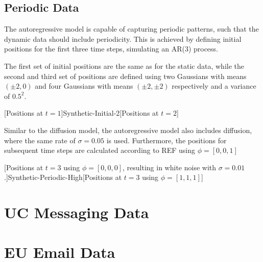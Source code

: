     \subsection{Periodic Data}
    
        The autoregressive model is capable of capturing periodic patterns, such that the dynamic data should include periodicity. This is achieved by defining initial positions for the first three time steps, simulating an AR(3) process. 
        
        The first set of initial positions are the same as for the static data, while the second and third set of positions are defined using two Gaussians with means $(\pm2,0)$ and four Gaussians with means $(\pm2,\pm2)$ respectively and a variance of $0.5^2$.
       
        [Positions at $t=1$]{Synthetic-Initial-2}[Positions at $t=2$]
        
        Similar to the diffusion model, the autoregressive model also includes diffusion, where the same rate of $\sigma=0.05$ is used. Furthermore, the positions for subsequent time steps are calculated according to REF using $\phi=[0, 0, 1]$
        
        
        
        
        
        [Positions at $t=3$ using $\phi=[0,0,0]$, resulting in white noise with $\sigma=0.01$.]{Synthetic-Periodic-High}[Positions at $t=3$ using $\phi=[1,1,1]$]
        
\section{UC Messaging Data}

    
\section{EU Email Data}

